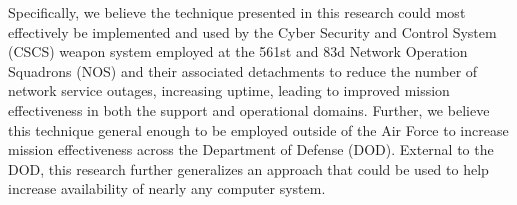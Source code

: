 Specifically, we believe the technique presented in this research could most
effectively be implemented and used by the Cyber Security and Control System
(CSCS) weapon system employed at the 561st and 83d Network Operation Squadrons
(NOS) and their associated detachments to reduce the number of network service
outages, increasing uptime, leading to improved mission effectiveness in both
the support and operational domains.  Further, we believe this technique
general enough to be employed outside of the Air Force to increase mission
effectiveness across the Department of Defense (DOD).  External to the DOD,
this research further generalizes an approach that could be used to help
increase availability of nearly any computer system.
